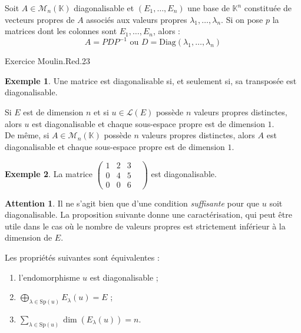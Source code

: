 \documentclass[french]{article}
\newcommand{\K}{\mathbb{K}}
\newcommand{\inv}{^{-1}}
\newcommand{\Sp}{\text{Sp}}
\theoremstyle{plain}
\theoremstyle{definition}
\newtheorem*{ex}{Exemple}
\newtheorem*{attention}{Attention}
\theoremstyle{remark}
\begin{document}
	\begin{met}
		Soit $A\in\mathcal{M}_n(\K)$ diagonalisable et $(E_1,\ldots,E_n)$ une base de $\K^n$ constituée de vecteurs propres de $A$ associés aux valeurs propres $\lambda_1,\ldots,\lambda_n$. Si on pose $p$ la matrices dont les colonnes sont $E_1,\ldots,E_n$, alors : $$A=PDP\inv \text{  ou  }D=\text{Diag}(\lambda_1,\ldots,\lambda_n)$$
	\end{met}
	
	Exercice Moulin.Red.23
	
	\begin{ex}
		Une matrice est diagonalisable si, et seulement si, sa transposée est diagonalisable.
	\end{ex}
	
	\begin{prop}%
		Si $E$ est de dimension $n$ et si $u\in\mathcal{L}(E)$ possède $n$ valeurs propres distinctes, alors $u$ est diagonalisable et chaque sous-espace propre est de dimension $1$.\\
		De même, si $A\in\mathcal{M}_n(\K)$ possède $n$ valeurs propres distinctes, alors $A$ est diagonalisable et chaque sous-espace propre est de dimension $1$.
	\end{prop}
	
	\begin{ex}
		La matrice $\begin{pmatrix}
			1&2&3&\\
			0&4&5\\
			0&0&6
		\end{pmatrix}$ est diagonalisable.
	\end{ex}
	
	\begin{attention}
		Il ne s'agit bien que d'une condition \textit{suffisante} pour que $u$ soit diagonalisable. La proposition suivante donne une caractérisation, qui peut être utile dans le cas où le nombre de valeurs propres est strictement inférieur à la dimension de $E$.
	\end{attention}
	
	\begin{prop}%
		Les propriétés suivantes sont équivalentes :
		\begin{enumerate}[label=(\roman*)]
			\item l'endomorphisme $u$ est diagonalisable ;
			\item $\displaystyle\bigoplus_{\lambda\in\Sp(u)}E_\lambda(u)=E$ ;
			\item $\displaystyle\sum_{\lambda\in\Sp(u)}\dim(E_\lambda(u))=n$.
		\end{enumerate}
	\end{prop}
	
\end{document}
